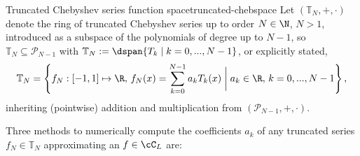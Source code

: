 \documentclass[12pt, a4paper]{article}
\newcommand{\chebyshev}{Chebyshev\xspace}
\begin{document}
  \begin{definition}{Truncated Chebyshev series function space}{truncated-chebspace}
    Let $(\mathbb{T}_N, +, \cdot)$ denote the ring of truncated \chebyshev series up to order $N \in \N$, $N > 1$, introduced as a subspace of the polynomials of degree up to $N-1$, so $\mathbb{T}_N \subseteq \mathcal{P}_{N-1}$ with $\mathbb{T}_N := \dspan\{T_k \;|\; k = 0, ..., N-1\}$, or explicitly stated,
    $$\mathbb{T}_N = \left\{f_N: [-1, 1] \mapsto \R,\, f_N(x) = \sum_{k=0}^{N-1} a_k T_k(x) \;\bigg|\; a_k \in \R,\, k = 0, ..., N-1\right\},$$
    inheriting (pointwise) addition and multiplication from $(\mathcal{P}_{N-1}, +, \cdot)$.
  \end{definition}

  Three methods to numerically compute the coefficients $a_k$ of any truncated series $f_N \in \mathbb{T}_N$ approximating an $f \in \cC_L$ are:
\end{document}
